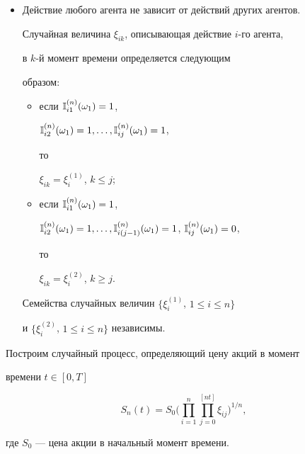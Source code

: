 \begin{itemize}


\item[$(5')$] Действие любого агента не зависит от действий других агентов.


Случайная величина $\xi_{ik}$, описывающая действие $i$-го агента,


в $k$-й момент времени определяется следующим


образом:


\begin{itemize}


\item[(A)] если $\Bbb I_{i1}^{(n)}(\omega_1)=1$,


$\IND_{i2}^{(n)}(\omega_1)=1,\dotsc,


\IND_{ij}^{(n)}(\omega_1)=1$,


то


$\xi_{ik}=\xi_i^{(1)}$, $k\le j$;


\item[(B)] если $\Bbb I_{i1}^{(n)}(\omega_1)=1$,


$\IND_{i2}^{(n)}(\omega_1)=1,\dotsc,


\IND_{i(j-1)}^{(n)}(\omega_1)=1$, $\IND_{ij}^{(n)}(\omega_1)=0$,


то


$\xi_{ik}=\xi_{i}^{(2)}$, $k\ge j$.


\end{itemize}


Семейства случайных величин $\{\xi_i^{(1)}$, $1\leq i\leq n\}$


и $\{\xi_i^{(2)}$, $1\leq i\leq n\}$ независимы.


\end{itemize}





Построим случайный процесс, определяющий цену акций в момент 


времени $t\in [0, T]$


$$


S_n(t)=


S_0\bigg(\prod_{i=1}^{n}\prod_{j=0}^{[nt]}\xi_{ij}\bigg)^{1/n},


$$


где $S_0$ --- цена акции в начальный момент времени.









